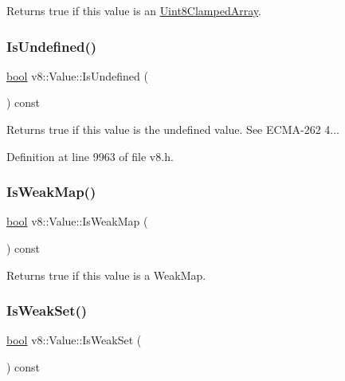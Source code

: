 Returns true if this value is an \mbox{\hyperlink{classv8_1_1Uint8ClampedArray}{Uint8\+Clamped\+Array}}. \mbox{\label{classv8_1_1Value_ad3a7686feef02fbe0317570b9640b078}} 
\subsubsection{\texorpdfstring{Is\+Undefined()}{IsUndefined()}}
{\footnotesize\ttfamily \mbox{\hyperlink{classbool}{bool}} v8\+::\+Value\+::\+Is\+Undefined (\begin{DoxyParamCaption}{ }\end{DoxyParamCaption}) const}

Returns true if this value is the undefined value. See E\+C\+M\+A-\/262 4... 

Definition at line 9963 of file v8.\+h.

\mbox{\label{classv8_1_1Value_a3be1c8f103d9aa9b31b3b1c56905337d}} 
\subsubsection{\texorpdfstring{Is\+Weak\+Map()}{IsWeakMap()}}
{\footnotesize\ttfamily \mbox{\hyperlink{classbool}{bool}} v8\+::\+Value\+::\+Is\+Weak\+Map (\begin{DoxyParamCaption}{ }\end{DoxyParamCaption}) const}

Returns true if this value is a Weak\+Map. \mbox{\label{classv8_1_1Value_a66c2dbb0ed13325f0f9e6b38e5e1992c}} 
\subsubsection{\texorpdfstring{Is\+Weak\+Set()}{IsWeakSet()}}
{\footnotesize\ttfamily \mbox{\hyperlink{classbool}{bool}} v8\+::\+Value\+::\+Is\+Weak\+Set (\begin{DoxyParamCaption}{ }\end{DoxyParamCaption}) const}

